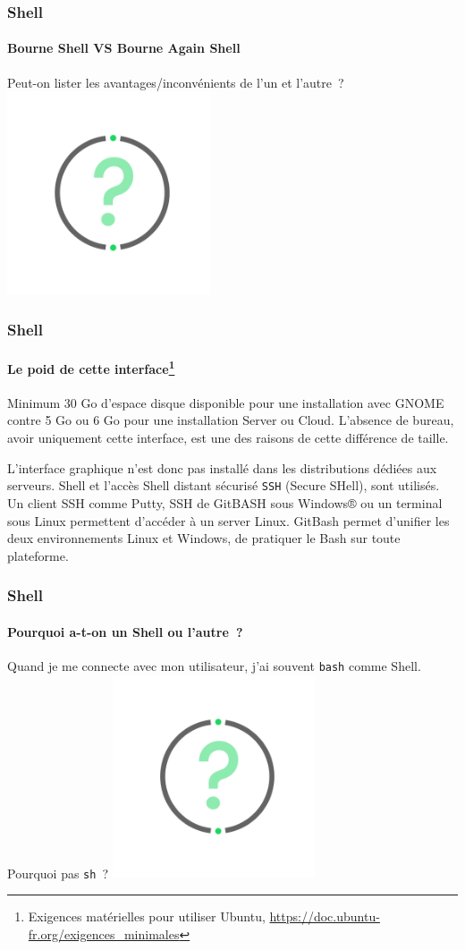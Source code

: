 \documentclass{beamer}
\begin{document}
    \begin{frame}
        \transdissolve
        \frametitle{Shell}
        \framesubtitle{Bourne Shell VS Bourne Again Shell}
        Peut-on lister les avantages/inconvénients de l'un et l'autre~?
        \bigbreak
        \centering
        \includegraphics[width=6cm]{image/question-mark}
    \end{frame}

    \begin{frame}
        \transdissolve
        \frametitle{Shell}
        \framesubtitle{Le poid de cette interface\footnote{Exigences matérielles pour utiliser Ubuntu, \url{https://doc.ubuntu-fr.org/exigences_minimales}}}
        Minimum 30 Go d'espace disque disponible pour une installation avec GNOME contre 5 Go ou 6 Go pour une installation Server ou Cloud.
        \bigbreak
        L'absence de bureau, avoir uniquement cette interface, est une des raisons de cette différence de taille.

        L'interface graphique n'est donc pas installé dans les distributions dédiées aux serveurs.
        Shell et l'accès Shell distant sécurisé \lstinline{SSH} (Secure SHell), sont utilisés.
        Un client SSH comme Putty, SSH de GitBASH sous Windows® ou un terminal sous Linux permettent d'accéder à un server Linux.
        \bigbreak
        GitBash permet d'unifier les deux environnements Linux et Windows, de pratiquer le Bash sur toute plateforme.
    \end{frame}

    \begin{frame}
        \transdissolve
        \frametitle{Shell}
        \framesubtitle{Pourquoi a-t-on un Shell ou l'autre~?}
        Quand je me connecte avec mon utilisateur, j'ai souvent \lstinline{bash} comme Shell.
        Pourquoi pas \lstinline{sh}~?
        \bigbreak
        \centering
        \includegraphics[width=6cm]{image/question-mark}
    \end{frame}
\end{document}
